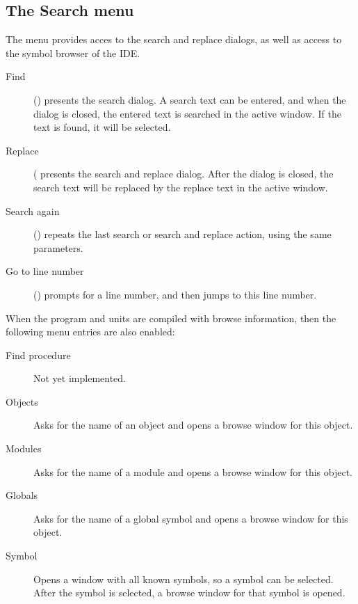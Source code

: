 %
%
\subsection{The Search menu}
\label{se:menusearch}
The  menu provides acces to the search and replace dialogs, as well as
access to the symbol browser of the IDE. 
\begin{description}
\item[Find] () presents the search dialog. A search text 
can be entered, and when the dialog is closed, the entered text is searched
in the active window. If the text is found, it will be selected. 
\item[Replace] ( presents the search and replace dialog.
After the dialog is closed, the search text will be replaced by the replace
text in the active window.
\item[Search again] () repeats the last search or search and replace action,
 using  the same parameters.
\item[Go to line number] () prompts for a line number, and
then jumps to this line number.
\end{description}
When the program and units are compiled with browse information, then
the following menu entries are also enabled:
\begin{description}
\item[Find procedure]
Not yet implemented.
\item[Objects]
Asks for the name of an object and opens a browse window for this object.
\item[Modules]
Asks for the name of a module and opens a browse window for this object.
\item[Globals]
Asks for the name of a global symbol and opens a browse window for this object.
\item[Symbol]
Opens a window with all known symbols, so a symbol can be selected. After
the symbol is selected, a browse window for that symbol is opened.
\end{description}
%
%
